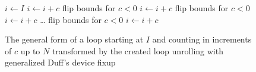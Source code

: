 \begin{figure}[H]
    \centering
    \begin{algorithmic}
        \State $i \gets I$
                \State {} 
                \State $i \gets i + c$ 
            \EndWhile
        \EndIf
             \Comment flip bounds for $c < 0$
                \State {}
                \State $i \gets i + c$ 
            \EndCase
             \Comment flip bounds for $c < 0$
                \State {}
                \State $i \gets i + c$ 
            \EndCase
            \State
            \ldots
             \Comment flip bounds for $c < 0$
                \State {}
                \State $i \gets i + c$
            \EndCase
        \EndSwitch
        \EndFunction
    \end{algorithmic}
    \caption{The general form of a loop starting at $I$ and counting in increments of $c$ up to $N$ transformed by the created loop unrolling with generalized Duff's device fixup}
    \label{fig:impl:fixup:duff:general-loop}
\end{figure}